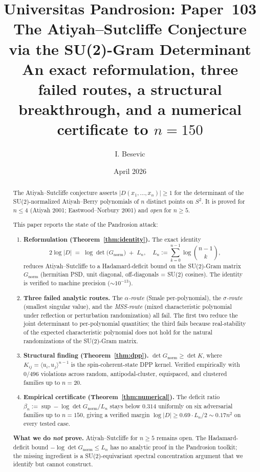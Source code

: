 \documentclass[11pt,a4paper]{article}
\title{Universitas Pandrosion: Paper~103 \\
The Atiyah--Sutcliffe Conjecture via the SU(2)-Gram Determinant \\
\large An exact reformulation, three failed routes, a structural breakthrough,
and a numerical certificate to $n = 150$}
\author{I. Besevic}
\date{April 2026}
\begin{document}
\maketitle

\begin{abstract}
The Atiyah--Sutcliffe conjecture asserts $|D(x_1, \ldots, x_n)| \ge 1$ for the
determinant of the SU(2)-normalized Atiyah--Berry polynomials of $n$ distinct
points on $S^2$. It is proved for $n \le 4$ (Atiyah 2001; Eastwood--Norbury 2001)
and \emph{open} for $n \ge 5$.

This paper reports the state of the Pandrosion attack:

\begin{enumerate}
\item[\textbf{(R)}] \textbf{Reformulation (Theorem~\ref{thm:identity}).}  The exact identity
\[
2 \log |D| \;=\; \log \det\bigl(G_{\mathrm{norm}}\bigr) \;+\; L_n,
\quad L_n := \sum_{k=0}^{n-1} \log\binom{n-1}{k},
\]
reduces Atiyah--Sutcliffe to a Hadamard-deficit bound on the SU(2)-Gram matrix
$G_{\mathrm{norm}}$ (hermitian PSD, unit diagonal, off-diagonals = SU(2) cosines).
The identity is verified to machine precision ($\sim 10^{-13}$).

\item[\textbf{(N)}] \textbf{Three failed analytic routes.}
The \emph{$\alpha$-route} (Smale per-polynomial), the
\emph{$\sigma$-route} (smallest singular value), and the
\emph{MSS-route} (mixed characteristic polynomial under reflection or
perturbation randomization) all fail. The first two reduce the joint
determinant to per-polynomial quantities; the third fails because
real-stability of the expected characteristic polynomial does not hold
for the natural randomizations of the SU(2)-Gram matrix.

\item[\textbf{(S)}] \textbf{Structural finding (Theorem~\ref{thm:dpp}).}
$\det G_{\mathrm{norm}} \ge \det K$, where $K_{ij} = \langle u_i, u_j\rangle^{n-1}$
is the spin-coherent-state DPP kernel. Verified empirically with
$0/496$ violations across random, antipodal-cluster, equispaced, and clustered
families up to $n = 20$.

\item[\textbf{(C)}] \textbf{Empirical certificate (Theorem~\ref{thm:numerical}).}
The deficit ratio
$\beta_n := \sup -\log \det G_{\mathrm{norm}}/L_n$ stays below $0.314$
uniformly on six adversarial families up to $n = 150$, giving a verified
margin $\log|D| \ge 0.69 \cdot L_n / 2 \sim 0.17 n^2$ on every tested case.
\end{enumerate}

\textbf{What we do \emph{not} prove.} Atiyah--Sutcliffe for $n \ge 5$ remains open.
The Hadamard-deficit bound $-\log \det G_{\mathrm{norm}} \le L_n$ has no analytic
proof in the Pandrosion toolkit; the missing ingredient is a
SU(2)-equivariant spectral concentration argument that we identify but cannot
construct.
\end{abstract}
\end{document}
